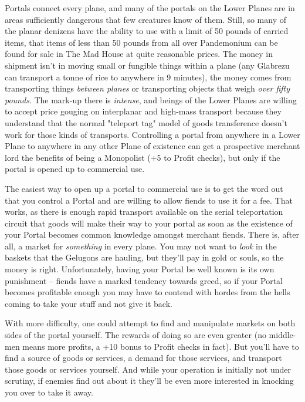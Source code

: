Portals connect every plane, and many of the portals on the Lower Planes are in areas sufficiently dangerous that few creatures know of them. Still, so many of the planar denizens have the ability to use  with a limit of 50 pounds of carried items, that items of less than 50 pounds from all over Pandemonium can be found for sale in The Mad House at quite reasonable prices. The money in shipment isn't in moving small or fungible things within a plane (any Glabrezu can transport a tonne of rice to anywhere in 9 minutes), the money comes from transporting things \textit{between planes} or transporting objects that weigh \textit{over fifty pounds}. The mark-up there is \textit{intense}, and beings of the Lower Planes are willing to accept price gouging on interplanar and high-mass transport because they understand that the normal "teleport tag" model of goods transference doesn't work for those kinds of transports. Controlling a portal from anywhere in a Lower Plane to anywhere in any other Plane of existence can get a prospective merchant lord the benefits of being a Monopolist (+5 to Profit checks), but only if the portal is opened up to commercial use.

The easiest way to open up a portal to commercial use is to get the word out that you control a Portal and are willing to allow fiends to use it for a fee. That works, as there is enough rapid transport available on the serial teleportation circuit that goods will make their way to your portal as soon as the existence of your Portal becomes common knowledge amongst merchant fiends. There is, after all, a market for \textit{something} in every plane. You may not want to \textit{look} in the baskets that the Gelugons are hauling, but they'll pay in gold or souls, so the money is right. Unfortunately, having your Portal be well known is its own punishment -- fiends have a marked tendency towards greed, so if your Portal becomes profitable enough you may have to contend with hordes from the hells coming to take your stuff and not give it back.

With more difficulty, one could attempt to find and manipulate markets on both sides of the portal yourself. The rewards of doing so are even greater (no middle-men means more profits, a +10 bonus to Profit checks in fact). But you'll have to find a source of goods or services, a demand for those services, and transport those goods or services yourself. And while your operation is initially not under scrutiny, if enemies find out about it they'll be even more interested in knocking you over to take it away.


